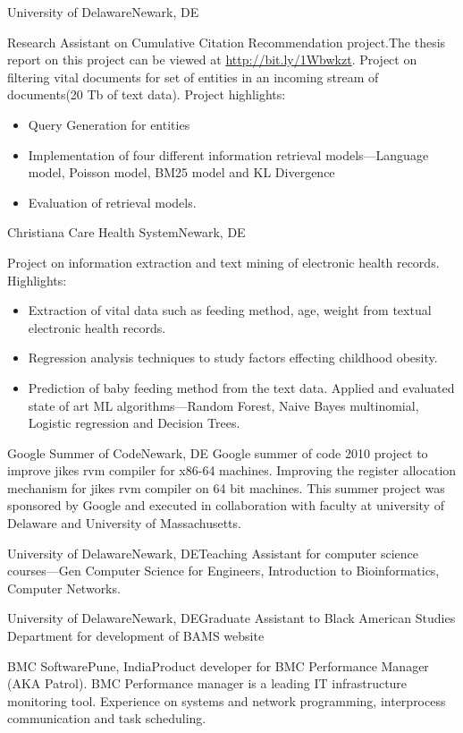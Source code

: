 \documentclass[10pt,a4paper,sans]{moderncv}        %
\begin{document}
 {University of Delaware}{Newark, DE}{}{Research Assistant on Cumulative Citation Recommendation project.The thesis report on this project can be viewed at \url{http://bit.ly/1Wbwkzt}. Project on filtering vital documents for set of entities in an incoming stream of documents(20 Tb of text data).  Project highlights:
\begin{itemize}
\item Query Generation for entities
\item Implementation of four different information retrieval models---Language model, Poisson model, BM25 model and KL Divergence
\item Evaluation of retrieval models.
\end{itemize}
}

 {Christiana Care Health System}{Newark, DE}{}{ Project on information extraction and text mining of electronic health records. Highlights:
\begin{itemize}
\item Extraction of vital data such as feeding method, age, weight from textual electronic health records.
\item Regression analysis techniques to study factors effecting childhood obesity.
\item Prediction of baby feeding method from the text data. Applied and evaluated state of art ML algorithms---Random Forest, Naive Bayes multinomial, Logistic regression and Decision Trees. 
\end{itemize}
}
 {Google Summer of Code}{Newark, DE}{}{ Google summer of code 2010 project to improve jikes rvm compiler for x86-64 machines. Improving the register allocation mechanism for jikes rvm compiler on 64 bit machines. This summer project was sponsored by Google and executed in collaboration with faculty at university of Delaware and University of Massachusetts.}

 {University of Delaware}{Newark, DE}{}{Teaching Assistant for computer science courses---Gen Computer Science for Engineers, Introduction to Bioinformatics, Computer Networks.}

 {University of Delaware}{Newark, DE}{}{Graduate Assistant to Black American Studies Department for development of BAMS website}

 {BMC Software}{Pune, India}{}{Product developer for BMC Performance Manager (AKA Patrol). BMC Performance manager is a leading IT infrastructure monitoring tool.  Experience on systems and network programming, interprocess communication and task scheduling. }
\end{document}
